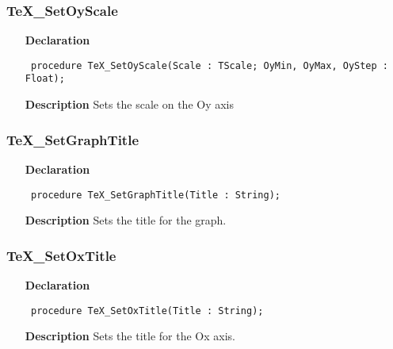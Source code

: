 \documentclass[12pt,a4paper,oneside]{report}
\newcommand{\declarationitem}[1]{\textbf{#1}}
\newcommand{\descriptiontitle}[1]{\textbf{#1}}
\newcommand{\code}[1]{\texttt{#1}}
\begin{document}
\subsubsection{TeX{\_}SetOyScale}
\label{utexplot-TeX_SetOyScale}
\begin{itemize}\item[\declarationitem{Declaration}\hfill]
	\begin{flushleft}
		\code{
			procedure TeX{\_}SetOyScale(Scale : TScale; OyMin, OyMax, OyStep : Float);}
		
	\end{flushleft}
	
	\par
	\item[\descriptiontitle{Description}]
	Sets the scale on the Oy axis
	
\end{itemize}
\subsubsection{TeX{\_}SetGraphTitle}
\label{utexplot-TeX_SetGraphTitle}
\begin{itemize}\item[\declarationitem{Declaration}\hfill]
	\begin{flushleft}
		\code{
			procedure TeX{\_}SetGraphTitle(Title : String);}
		
	\end{flushleft}
	
	\par
	\item[\descriptiontitle{Description}]
	Sets the title for the graph.
	
\end{itemize}
\subsubsection{TeX{\_}SetOxTitle}
\label{utexplot-TeX_SetOxTitle}
\begin{itemize}\item[\declarationitem{Declaration}\hfill]
	\begin{flushleft}
		\code{
			procedure TeX{\_}SetOxTitle(Title : String);}
		
	\end{flushleft}
	
	\par
	\item[\descriptiontitle{Description}]
	Sets the title for the Ox axis.
	
\end{itemize}
\end{document}
